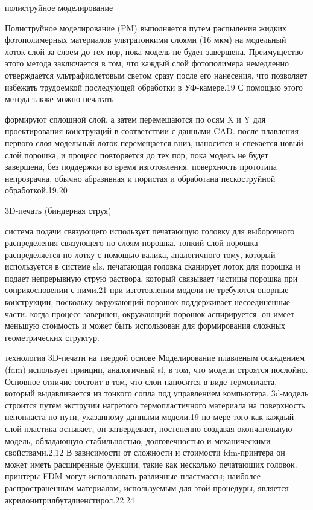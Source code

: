 полиструйное моделирование

Полиструйное моделирование (PM) выполняется путем распыления жидких
фотополимерных материалов ультратонкими слоями (16 мкм) на модельный лоток слой
за слоем до тех пор, пока модель не будет завершена. Преимущество этого метода
заключается в том, что каждый слой фотополимера немедленно отверждается
ультрафиолетовым светом сразу после его нанесения, что позволяет избежать
трудоемкой последующей обработки в УФ-камере.19 С помощью этого метода также
можно печатать


формируют сплошной слой, а затем перемещаются по осям X и Y для проектирования
конструкций в соответствии с данными CAD. после плавления первого слоя модельный
лоток перемещается вниз, наносится и спекается новый слой порошка, и процесс
повторяется до тех пор, пока модель не будет завершена, без поддержки во время
изготовления. поверхность прототипа непрозрачна, обычно абразивная и пористая и
обработана пескоструйной обработкой.19,20

3D-печать (биндерная струя)

система подачи связующего использует печатающую головку для выборочного
распределения связующего по слоям порошка. тонкий слой порошка распределяется по
лотку с помощью валика, аналогичного тому, который используется в системе sls.
печатающая головка сканирует лоток для порошка и подает непрерывную струю
раствора, который связывает частицы порошка при соприкосновении с ними.21
при изготовлении модели не требуются опорные конструкции, поскольку окружающий
порошок поддерживает несоединенные части. когда процесс завершен, окружающий
порошок аспирируется. он имеет меньшую стоимость и может быть использован для
формирования сложных геометрических структур.

технология 3D-печати на твердой основе
Моделирование плавленым осаждением (fdm) использует принцип, аналогичный sl, в
том, что модели строятся послойно. Основное отличие состоит в том, что слои
наносятся в виде термопласта, который выдавливается из тонкого сопла под
управлением компьютера. 3d-модель строится путем экструзии нагретого
термопластичного материала на поверхность пенопласта по пути, указанному данными
модели.19
по мере того как каждый слой пластика остывает, он затвердевает, постепенно
создавая окончательную модель, обладающую стабильностью, долговечностью и
механическими свойствами.2,12 В зависимости от сложности и стоимости
fdm-принтера он может иметь расширенные функции, такие как несколько печатающих
головок. принтеры FDM могут использовать различные пластмассы; наиболее
распространенным материалом, используемым для этой процедуры, является
акрилонитрилбутадиенстирол.22,24


